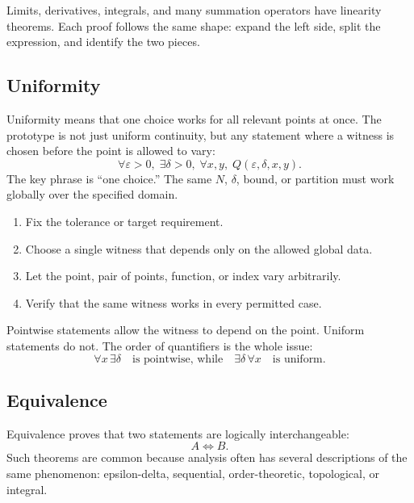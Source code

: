 \begin{remark}
Limits, derivatives, integrals, and many summation operators have linearity
theorems. Each proof follows the same shape: expand the left side, split the
expression, and identify the two pieces.
\end{remark}

\subsection*{Uniformity}
\label{subsec:property-uniformity}

Uniformity means that one choice works for all relevant points at once. The
prototype is not just uniform continuity, but any statement where a witness is
chosen before the point is allowed to vary:
\[
  \forall\varepsilon>0,\;\exists\delta>0,\;\forall x,y,\;Q(\varepsilon,\delta,x,y).
\]
The key phrase is ``one choice.'' The same $N$, $\delta$, bound, or partition
must work globally over the specified domain.

\begin{remark}
\begin{enumerate}
  \item Fix the tolerance or target requirement.
  \item Choose a single witness that depends only on the allowed global data.
  \item Let the point, pair of points, function, or index vary arbitrarily.
  \item Verify that the same witness works in every permitted case.
\end{enumerate}
\end{remark}

\begin{remark}
Pointwise statements allow the witness to depend on the point. Uniform
statements do not. The order of quantifiers is the whole issue:
\[
  \forall x\,\exists\delta
  \quad\text{is pointwise, while}\quad
  \exists\delta\,\forall x
  \quad\text{is uniform.}
\]
\end{remark}

\subsection*{Equivalence}
\label{subsec:property-equivalence}

Equivalence proves that two statements are logically interchangeable:
\[
  A\Longleftrightarrow B.
\]
Such theorems are common because analysis often has several descriptions of
the same phenomenon: epsilon-delta, sequential, order-theoretic, topological,
or integral.

